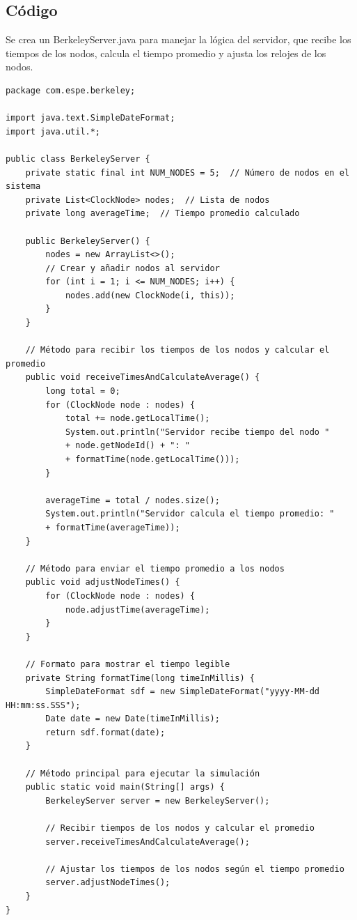 \documentclass[a4paper,12pt]{report}
\begin{document}
\subsection{Código}
Se crea un BerkeleyServer.java para manejar la lógica del servidor, que recibe los tiempos de los nodos, calcula el tiempo promedio y ajusta los relojes de los nodos.
\begin{verbatim}
package com.espe.berkeley;

import java.text.SimpleDateFormat;
import java.util.*;

public class BerkeleyServer {
    private static final int NUM_NODES = 5;  // Número de nodos en el sistema
    private List<ClockNode> nodes;  // Lista de nodos
    private long averageTime;  // Tiempo promedio calculado

    public BerkeleyServer() {
        nodes = new ArrayList<>();
        // Crear y añadir nodos al servidor
        for (int i = 1; i <= NUM_NODES; i++) {
            nodes.add(new ClockNode(i, this));
        }
    }

    // Método para recibir los tiempos de los nodos y calcular el promedio
    public void receiveTimesAndCalculateAverage() {
        long total = 0;
        for (ClockNode node : nodes) {
            total += node.getLocalTime();
            System.out.println("Servidor recibe tiempo del nodo " 
            + node.getNodeId() + ": " 
            + formatTime(node.getLocalTime()));
        }

        averageTime = total / nodes.size();
        System.out.println("Servidor calcula el tiempo promedio: " 
        + formatTime(averageTime));
    }

    // Método para enviar el tiempo promedio a los nodos
    public void adjustNodeTimes() {
        for (ClockNode node : nodes) {
            node.adjustTime(averageTime);
        }
    }

    // Formato para mostrar el tiempo legible
    private String formatTime(long timeInMillis) {
        SimpleDateFormat sdf = new SimpleDateFormat("yyyy-MM-dd HH:mm:ss.SSS");
        Date date = new Date(timeInMillis);
        return sdf.format(date);
    }

    // Método principal para ejecutar la simulación
    public static void main(String[] args) {
        BerkeleyServer server = new BerkeleyServer();

        // Recibir tiempos de los nodos y calcular el promedio
        server.receiveTimesAndCalculateAverage();

        // Ajustar los tiempos de los nodos según el tiempo promedio
        server.adjustNodeTimes();
    }
}
\end{verbatim}
\end{document}
